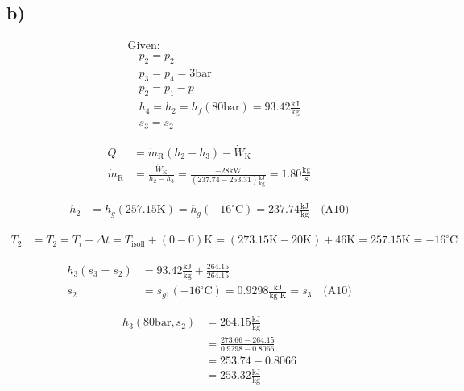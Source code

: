 

\subsection*{b)}

\begin{align*}
&\text{Given:} \\
&\quad p_2 = p_2 \\
&\quad p_3 = p_4 = 3 \text{bar} \\
&\quad p_2 = p_1 - p \\
&\quad h_4 = h_2 = h_f (80 \text{bar}) = 93.42 \frac{\text{kJ}}{\text{kg}} \\
&\quad s_3 = s_2
\end{align*}

\begin{align*}
Q &= \dot{m}_{\text{R}} (h_2 - h_3) - \dot{W}_{\text{K}} \\
\dot{m}_{\text{R}} &= \frac{\dot{W}_{\text{K}}}{h_2 - h_3} = \frac{-28 \text{kW}}{(237.74 - 253.31) \frac{\text{kJ}}{\text{kg}}} = 1.80 \frac{\text{kg}}{\text{s}}
\end{align*}

\begin{align*}
h_2 &= h_g (257.15 \text{K}) = h_g (-16^\circ \text{C}) = 237.74 \frac{\text{kJ}}{\text{kg}} \quad \text{(A10)}
\end{align*}

\begin{align*}
T_2 &= T_2 = T_i - \Delta t = T_{\text{isoll}} + (0 - 0) \text{K} = (273.15 \text{K} - 20 \text{K}) + 46 \text{K} = 257.15 \text{K} = -16^\circ \text{C}
\end{align*}

\begin{align*}
h_3 (s_3 = s_2) &= 93.42 \frac{\text{kJ}}{\text{kg}} + \frac{264.15}{264.15} \\
s_2 &= s_{g1} (-16^\circ \text{C}) = 0.9298 \frac{\text{kJ}}{\text{kg K}} = s_3 \quad \text{(A10)}
\end{align*}

\begin{align*}
h_3 (80 \text{bar}, s_2) &= 264.15 \frac{\text{kJ}}{\text{kg}} \\
&= \frac{273.66 - 264.15}{0.9298 - 0.8066} \\
&= 253.74 - 0.8066 \\
&= 253.32 \frac{\text{kJ}}{\text{kg}}
\end{align*}